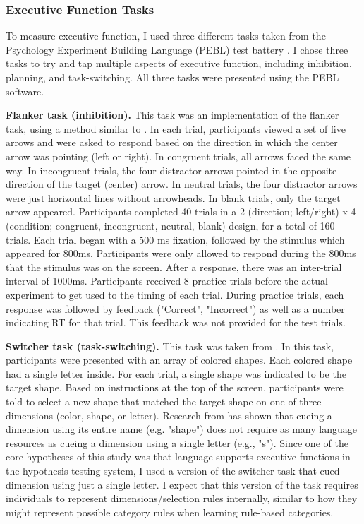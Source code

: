 \documentclass[../dissertation.tex]{subfiles}
\begin{document}
\subsubsection{Executive Function Tasks} 
To measure executive function, I used three different tasks taken from the Psychology Experiment Building Language (PEBL) test battery \citep{Mueller2014}. I chose three tasks to try and tap multiple aspects of executive function, including inhibition, planning, and task-switching. All three tasks were presented using the PEBL software.\par
\textbf{Flanker task (inhibition).} This task was an implementation of the \citet{Eriksen1979} flanker task, using a method similar to \citet{Stins2007}. In each trial, participants viewed a set of five arrows and were asked to respond based on the direction in which the center arrow was pointing (left or right). In congruent trials, all arrows faced the same way. In incongruent trials, the four distractor arrows pointed in the opposite direction of the target (center) arrow. In neutral trials, the four distractor arrows were just horizontal lines without arrowheads. In blank trials, only the target arrow appeared. Participants completed 40 trials in a 2 (direction; left/right) x 4 (condition; congruent, incongruent, neutral, blank) design, for a total of 160 trials. Each trial began with a 500 ms fixation, followed by the stimulus which appeared for 800ms. Participants were only allowed to respond during the 800ms that the stimulus was on the screen. After a response, there was an inter-trial interval of 1000ms. Participants received 8 practice trials before the actual experiment to get used to the timing of each trial. During practice trials, each response was followed by feedback ("Correct", "Incorrect") as well as a number indicating RT for that trial. This feedback was not provided for the test trials. \par
\textbf{Switcher task (task-switching).} This task was taken from \citet{Anderson2012}. In this task, participants were presented with an array of colored shapes. Each colored shape had a single letter inside. For each trial, a single shape was indicated to be the target shape. Based on instructions at the top of the screen, participants were told to select a new shape that matched the target shape on one of three dimensions (color, shape, or letter). Research from \citet{Miyake2004} has shown that cueing a dimension using its entire name (e.g. "shape") does not require as many language resources as cueing a dimension using a single letter (e.g., "s"). Since one of the core hypotheses of this study was that language supports executive functions in the hypothesis-testing system, I used a version of the switcher task that cued dimension using just a single letter. I expect that this version of the task requires individuals to represent dimensions/selection rules internally, similar to how they might represent possible category rules when learning rule-based categories. \par
\end{document}

